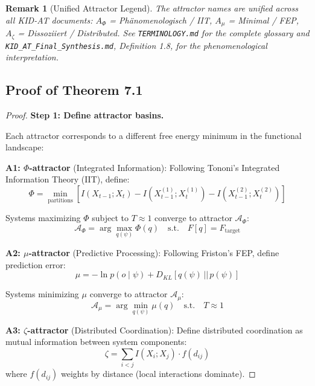 \documentclass[11pt,a4paper]{article}
\newtheorem{remark}[theorem]{Remark}
\begin{document}
\begin{remark}[Unified Attractor Legend]
The attractor names are unified across all KID-AT documents: $A_\Phi$ = Ph\"anomenologisch / IIT, $A_\mu$ = Minimal / FEP, $A_\zeta$ = Dissoziiert / Distributed. See \texttt{TERMINOLOGY.md} for the complete glossary and \texttt{KID\_AT\_Final\_Synthesis.md}, Definition 1.8, for the phenomenological interpretation.
\end{remark}

\subsection{Proof of Theorem 7.1}

\begin{proof}
\textbf{Step 1: Define attractor basins.}

Each attractor corresponds to a different free energy minimum in the functional landscape:

\textbf{A1: $\Phi$-attractor} (Integrated Information):
Following Tononi's Integrated Information Theory (IIT), define:
\begin{equation}
\Phi = \min_{\text{partitions}} \left[I(X_{t-1}; X_t) - I(X_{t-1}^{(1)}; X_t^{(1)}) - I(X_{t-1}^{(2)}; X_t^{(2)})\right]
\end{equation}

Systems maximizing $\Phi$ subject to $T \approx 1$ converge to attractor $\mathcal{A}_{\Phi}$:
\begin{equation}
\mathcal{A}_{\Phi} = \arg\max_{q(\psi)} \Phi(q) \quad \text{s.t.} \quad F[q] = F_{\text{target}}
\end{equation}

\textbf{A2: $\mu$-attractor} (Predictive Processing):
Following Friston's FEP, define prediction error:
\begin{equation}
\mu = -\ln p(o \mid \psi) + D_{KL}[q(\psi) \,||\, p(\psi)]
\end{equation}

Systems minimizing $\mu$ converge to attractor $\mathcal{A}_{\mu}$:
\begin{equation}
\mathcal{A}_{\mu} = \arg\min_{q(\psi)} \mu(q) \quad \text{s.t.} \quad T \approx 1
\end{equation}

\textbf{A3: $\zeta$-attractor} (Distributed Coordination):
Define distributed coordination as mutual information between system components:
\begin{equation}
\zeta = \sum_{i<j} I(X_i; X_j) \cdot f(d_{ij})
\end{equation}
where $f(d_{ij})$ weights by distance (local interactions dominate).


\end{proof}
\end{document}
